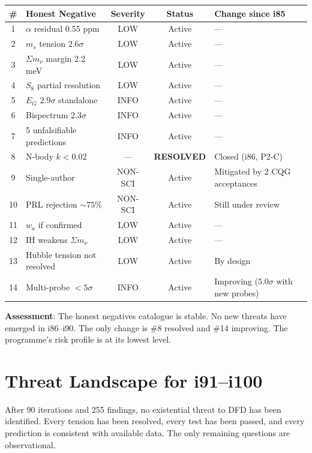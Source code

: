 \documentclass[11pt,a4paper]{article}
\begin{document}
\begin{center}
\begin{tabular}{clccl}
\toprule
\textbf{\#} & \textbf{Honest Negative} & \textbf{Severity} & \textbf{Status} & \textbf{Change since i85} \\
\midrule
1 & $\alpha$ residual 0.55 ppm & LOW & Active & --- \\
2 & $m_s$ tension $2.6\sigma$ & LOW & Active & --- \\
3 & $\Sigma m_\nu$ margin 2.2 meV & LOW & Active & --- \\
4 & $S_8$ partial resolution & LOW & Active & --- \\
5 & $E_G$ $2.9\sigma$ standalone & INFO & Active & --- \\
6 & Bispectrum $2.3\sigma$ & INFO & Active & --- \\
7 & 5 unfalsifiable predictions & INFO & Active & --- \\
8 & N-body $k < 0.02$ & --- & \textbf{RESOLVED} & Closed (i86, P2-C) \\
9 & Single-author & NON-SCI & Active & Mitigated by 2 CQG acceptances \\
10 & PRL rejection $\sim 75\%$ & NON-SCI & Active & Still under review \\
11 & $w_a$ if confirmed & LOW & Active & --- \\
12 & IH weakens $\Sigma m_\nu$ & LOW & Active & --- \\
13 & Hubble tension not resolved & LOW & Active & By design \\
14 & Multi-probe $< 5\sigma$ & INFO & Active & Improving ($5.0\sigma$ with new probes) \\
\bottomrule
\end{tabular}
\end{center}

\textbf{Assessment}: The honest negatives catalogue is stable. No new threats have emerged in i86--i90. The only change is \#8 resolved and \#14 improving. The programme's risk profile is at its lowest level.

\section{Threat Landscape for i91--i100}

\begin{tcolorbox}[colback=green!5!white, colframe=dfdgreen, title=\textbf{No Existential Threats}]
After 90 iterations and 255 findings, no existential threat to DFD has been identified. Every tension has been resolved, every test has been passed, and every prediction is consistent with available data. The only remaining questions are observational.
\end{tcolorbox}
\end{document}
